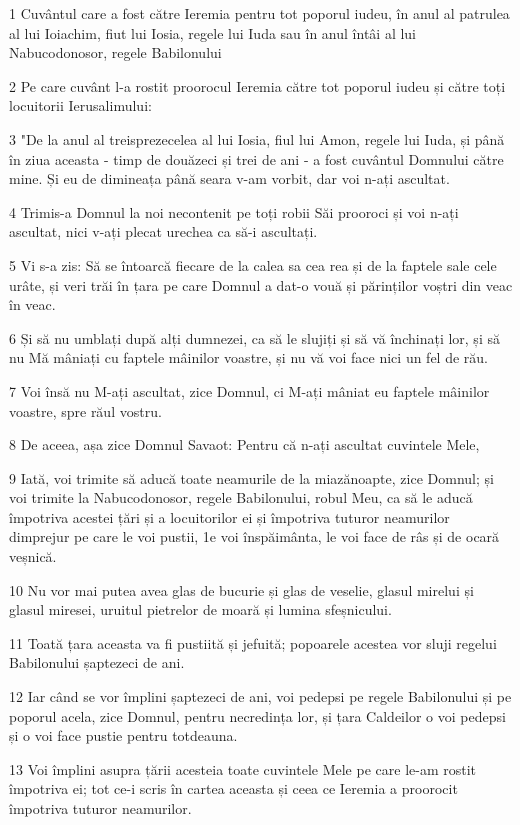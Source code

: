 \par 1 Cuvântul care a fost către Ieremia pentru tot poporul iudeu, în anul al patrulea al lui Ioiachim, fiut lui Iosia, regele lui Iuda sau în anul întâi al lui Nabucodonosor, regele Babilonului
\par 2 Pe care cuvânt l-a rostit proorocul Ieremia către tot poporul iudeu și către toți locuitorii Ierusalimului:
\par 3 "De la anul al treisprezecelea al lui Iosia, fiul lui Amon, regele lui Iuda, și până în ziua aceasta - timp de douăzeci și trei de ani - a fost cuvântul Domnului către mine. Și eu de dimineața până seara v-am vorbit, dar voi n-ați ascultat.
\par 4 Trimis-a Domnul la noi necontenit pe toți robii Săi prooroci și voi n-ați ascultat, nici v-ați plecat urechea ca să-i ascultați.
\par 5 Vi s-a zis: Să se întoarcă fiecare de la calea sa cea rea și de la faptele sale cele urâte, și veri trăi în țara pe care Domnul a dat-o vouă și părinților voștri din veac în veac.
\par 6 Și să nu umblați după alți dumnezei, ca să le slujiți și să vă închinați lor, și să nu Mă mâniați cu faptele mâinilor voastre, și nu vă voi face nici un fel de rău.
\par 7 Voi însă nu M-ați ascultat, zice Domnul, ci M-ați mâniat eu faptele mâinilor voastre, spre răul vostru.
\par 8 De aceea, așa zice Domnul Savaot: Pentru că n-ați ascultat cuvintele Mele,
\par 9 Iată, voi trimite să aducă toate neamurile de la miazănoapte, zice Domnul; și voi trimite la Nabucodonosor, regele Babilonului, robul Meu, ca să le aducă împotriva acestei țări și a locuitorilor ei și împotriva tuturor neamurilor dimprejur pe care le voi pustii, 1e voi înspăimânta, le voi face de râs și de ocară veșnică.
\par 10 Nu vor mai putea avea glas de bucurie și glas de veselie, glasul mirelui și glasul miresei, uruitul pietrelor de moară și lumina sfeșnicului.
\par 11 Toată țara aceasta va fi pustiită și jefuită; popoarele acestea vor sluji regelui Babilonului șaptezeci de ani.
\par 12 Iar când se vor împlini șaptezeci de ani, voi pedepsi pe regele Babilonului și pe poporul acela, zice Domnul, pentru necredința lor, și țara Caldeilor o voi pedepsi și o voi face pustie pentru totdeauna.
\par 13 Voi împlini asupra țării acesteia toate cuvintele Mele pe care le-am rostit împotriva ei; tot ce-i scris în cartea aceasta și ceea ce Ieremia a proorocit împotriva tuturor neamurilor.

